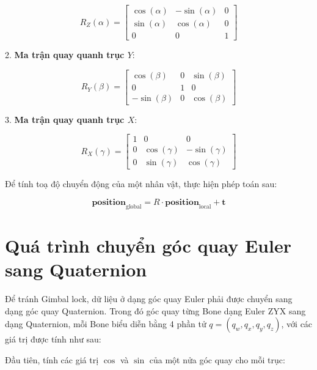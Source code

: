 \[
R_Z(\alpha) = 
\begin{bmatrix}
	\cos(\alpha) & -\sin(\alpha) & 0 \\
	\sin(\alpha) & \cos(\alpha) & 0 \\
	0 & 0 & 1
\end{bmatrix}
\]

2. \textbf{Ma trận quay quanh trục \(Y\)}:

\[
R_Y(\beta) = 
\begin{bmatrix}
	\cos(\beta) & 0 & \sin(\beta) \\
	0 & 1 & 0 \\
	-\sin(\beta) & 0 & \cos(\beta)
\end{bmatrix}
\]

3. \textbf{Ma trận quay quanh trục \(X\)}:

\[
R_X(\gamma) = 
\begin{bmatrix}
	1 & 0 & 0 \\
	0 & \cos(\gamma) & -\sin(\gamma) \\
	0 & \sin(\gamma) & \cos(\gamma)
\end{bmatrix}
\]

Để tính toạ độ chuyển động của một nhân vật, thực hiện phép toán sau:

\begin{equation}
	\mathbf{position}_{\text{global}} = R \cdot \mathbf{position}_{\text{local}} + \mathbf{t}
\end{equation}


\section{Quá trình chuyển góc quay Euler sang Quaternion}
\label{appendix:BVHData:QuaternionConvert}



Để tránh Gimbal lock, dữ liệu ở dạng góc quay Euler phải được chuyển sang dạng góc quay Quaternion. Trong đó góc quay từng Bone dạng Euler ZYX sang dạng Quaternion, mỗi Bone biểu diễn bằng 4 phần tử $q = (q_w, q_x, q_y, q_z)$, với các giá trị được tính như sau:

Đầu tiên, tính các giá trị $\cos$ và $\sin$ của một nửa góc quay cho mỗi trục:


